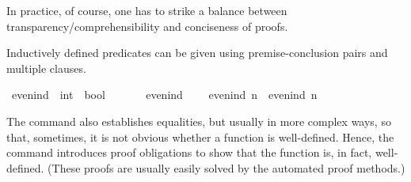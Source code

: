 \begin{isabellebody}
%
\isadelimvisible
%
\endisadelimvisible
%
\begin{isamarkuptext}%
In practice, of course, one has to strike a balance between transparency/comprehensibility and conciseness of proofs.%
\end{isamarkuptext}\isamarkuptrue%
%
\isadelimdocument
%
\endisadelimdocument
%
\isatagdocument
%
\isamarkuptrue%
%
\endisatagdocument
{\isafolddocument}%
%
\isadelimdocument
%
\endisadelimdocument
%
\begin{isamarkuptext}%
Inductively defined predicates can be given using premise-conclusion pairs and multiple clauses.%
\end{isamarkuptext}\isamarkuptrue%
\isamarkupfalse%
\ even{\isacharunderscore}{\kern0pt}ind\ {\isacharcolon}{\kern0pt}{\isacharcolon}{\kern0pt}\ {\isacartoucheopen}int\ {\isasymRightarrow}\ bool{\isacartoucheclose}\isanewline
\ \ \isanewline
\ \ \ \ {\isacartoucheopen}even{\isacharunderscore}{\kern0pt}ind\ {}{\isacartoucheclose}\isanewline
\ \ {\isacharbar}{\kern0pt}\ {\isacartoucheopen}even{\isacharunderscore}{\kern0pt}ind\ n\ {\isasymLongrightarrow}\ even{\isacharunderscore}{\kern0pt}ind\ {\isacharparenleft}{\kern0pt}n{\isacharplus}{\kern0pt}{}{\isacharparenright}{\kern0pt}{\isacartoucheclose}%
\isadelimdocument
%
\endisadelimdocument
%
\isatagdocument
%
\isamarkuptrue%
%
\endisatagdocument
{\isafolddocument}%
%
\isadelimdocument
%
\endisadelimdocument
%
\begin{isamarkuptext}%
The command  also establishes equalities, but usually in more complex ways, so that, sometimes, it is not obvious whether a function is well-defined. Hence, the command  introduces proof obligations to show that the function is, in fact, well-defined. (These proofs are usually easily solved by the automated proof methods.)


\end{isamarkuptext}
\end{isabellebody}
